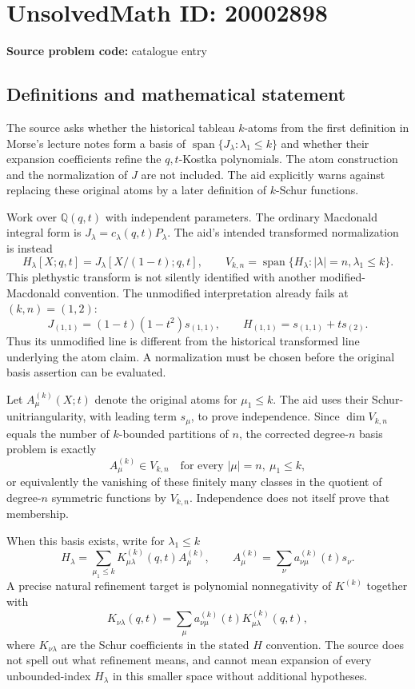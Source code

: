\documentclass[11pt]{article}
\newcommand{\Q}{\mathbb{Q}}
\begin{document}
\section*{UnsolvedMath ID: 20002898}
\textbf{Source problem code:} catalogue entry
\subsection{Definitions and mathematical statement}
The source asks whether the historical tableau $k$-atoms from the first definition in Morse's lecture notes form a basis of $\operatorname{span}\{J_\lambda:\lambda_1\le k\}$ and whether their expansion coefficients refine the $q,t$-Kostka polynomials. The atom construction and the normalization of $J$ are not included. The aid explicitly warns against replacing these original atoms by a later definition of $k$-Schur functions.

Work over $\Q(q,t)$ with independent parameters. The ordinary Macdonald integral form is $J_\lambda=c_\lambda(q,t)P_\lambda$. The aid's intended transformed normalization is instead
\[
 H_\lambda[X;q,t]=J_\lambda[X/(1-t);q,t],
 \qquad
 V_{k,n}=\operatorname{span}\{H_\lambda:|\lambda|=n,\lambda_1\le k\}.
\]
This plethystic transform is not silently identified with another modified-Macdonald convention. The unmodified interpretation already fails at $(k,n)=(1,2)$:
\[
 J_{(1,1)}=(1-t)(1-t^2)s_{(1,1)},\qquad
 H_{(1,1)}=s_{(1,1)}+t s_{(2)}.
\]
Thus its unmodified line is different from the historical transformed line underlying the atom claim. A normalization must be chosen before the original basis assertion can be evaluated.

Let $A_\mu^{(k)}(X;t)$ denote the original atoms for $\mu_1\le k$. The aid uses their Schur-unitriangularity, with leading term $s_\mu$, to prove independence. Since $\dim V_{k,n}$ equals the number of $k$-bounded partitions of $n$, the corrected degree-$n$ basis problem is exactly
\[
 A_\mu^{(k)}\in V_{k,n}\quad\text{for every }|\mu|=n,\ \mu_1\le k,
\]
or equivalently the vanishing of these finitely many classes in the quotient of degree-$n$ symmetric functions by $V_{k,n}$. Independence does not itself prove that membership.

When this basis exists, write for $\lambda_1\le k$
\[
 H_\lambda=\sum_{\mu_1\le k}K^{(k)}_{\mu\lambda}(q,t)A_\mu^{(k)},
 \qquad A_\mu^{(k)}=\sum_\nu a_{\nu\mu}^{(k)}(t)s_\nu.
\]
A precise natural refinement target is polynomial nonnegativity of $K^{(k)}$ together with
\[
 K_{\nu\lambda}(q,t)=\sum_\mu
 a_{\nu\mu}^{(k)}(t)K^{(k)}_{\mu\lambda}(q,t),
\]
where $K_{\nu\lambda}$ are the Schur coefficients in the stated $H$ convention. The source does not spell out what refinement means, and cannot mean expansion of every unbounded-index $H_\lambda$ in this smaller space without additional hypotheses.
\end{document}
